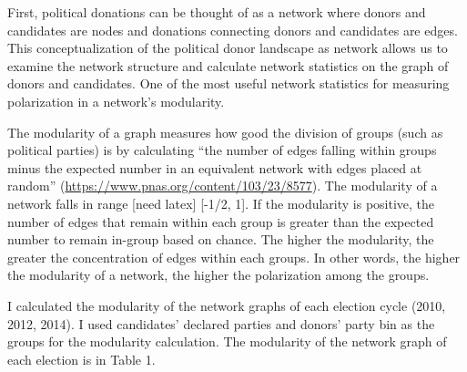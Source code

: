 \documentclass[11pt,]{article}
\begin{document}
First, political donations can be thought of as a network where donors
and candidates are nodes and donations connecting donors and candidates
are edges. This conceptualization of the political donor landscape as
network allows us to examine the network structure and calculate network
statistics on the graph of donors and candidates. One of the most useful
network statistics for measuring polarization in a network's modularity.

The modularity of a graph measures how good the division of groups (such
as political parties) is by calculating ``the number of edges falling
within groups minus the expected number in an equivalent network with
edges placed at random''
(\url{https://www.pnas.org/content/103/23/8577}). The modularity of a
network falls in range {[}need latex{]} {[}-1/2, 1{]}. If the modularity
is positive, the number of edges that remain within each group is
greater than the expected number to remain in-group based on chance. The
higher the modularity, the greater the concentration of edges within
each groups. In other words, the higher the modularity of a network, the
higher the polarization among the groups.

I calculated the modularity of the network graphs of each election cycle
(2010, 2012, 2014). I used candidates' declared parties and donors'
party bin as the groups for the modularity calculation. The modularity
of the network graph of each election is in Table 1.
\end{document}
